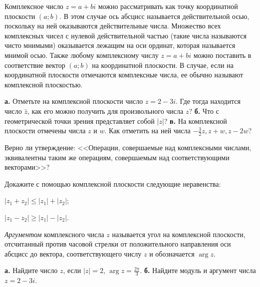 \documentclass[a4paper, 12pt, num=21]{listok}
\begin{document}
\begin{definition}
	Комплексное число $z = a + bi$ можно рассматривать как точку координатной плоскости $(a; b)$.
	В этом случае ось абсцисс называется действительной осью, поскольку на ней оказываются действительные числа.
	Множество всех комплексных чисел с нулевой действительной частью (такие числа называются чисто мнимыми) оказывается лежащим на оси ординат,
	которая называется мнимой осью.
	Также любому комплексному числу $z = a + bi$ можно поставить в соответствие вектор $(a; b)$ на координатной плоскости.
	В случае, если на координатной плоскости отмечаются комплексные числа, ее обычно называют комплексной плоскостью.
\end{definition}
\begin{problem}
	\textbf{а.} Отметьте на комплексной плоскости число $z = 2 - 3i$. Где тогда находится число $\bar z$,
	как его можно получить для произвольного числа $z$?
	\textbf{б.} Что с геометрической точки зрения представляет собой $|z|$?
	\textbf{в.} На комплексной плоскости отмечены числа $z$ и $w$.
	Как отметить на ней числа $-\frac 32 z, z + w, z - 2w$?
\end{problem}
\begin{problem}
	Верно ли утверждение: <<Операции, совершаемые над комплексными числами, эквивалентны таким же операциям, совершаемым над соответствующими векторами>>?
\end{problem}
\begin{problem}
	Докажите с помощью комплексной плоскости следующие неравенства:
	\begin{enumerate}
	\begin{multicols}{2}
		\item  $|z_1 + z_2| \le |z_1| + |z_2|$;
		\item  $|z_1 - z_2| \ge |z_1| - |z_2|$.
	\end{multicols}
	\end{enumerate}
\end{problem}
\begin{definition}
	\textit{Аргументом} комплексного числа $z$ называется угол на комплексной плоскости,
	отсчитанный против часовой стрелки от положительного направления оси абсцисс до вектора,
	соответствующего числу $z$ и обозначается $\arg z$.
\end{definition}
\begin{problem}
	\textbf{а.} Найдите число $z$, если $|z| = 2$, $\arg z = \frac{2\pi}3$.
	\textbf{б.} Найдите модуль и аргумент числа $z = 2 - 3i$.
\end{problem}
\end{document}
